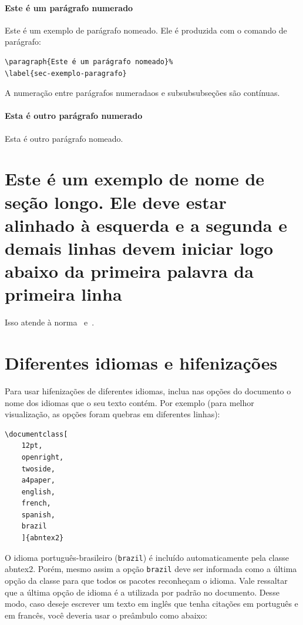 \paragraph{Este é um parágrafo numerado}%
\label{sec-exemplo-paragrafo}

Este é um exemplo de parágrafo nomeado. Ele é produzida com o comando de
parágrafo:

\begin{verbatim}
\paragraph{Este é um parágrafo nomeado}%
\label{sec-exemplo-paragrafo}
\end{verbatim}

A numeração entre parágrafos numeradaos e subsubsubseções são contínuas.

\paragraph{Esta é outro parágrafo numerado}%
\label{sec-exemplo-paragrafo-outro}

Esta é outro parágrafo nomeado.

\section{Este é um exemplo de nome de seção longo. Ele deve estar
alinhado à esquerda e a segunda e demais linhas devem iniciar logo abaixo da
primeira palavra da primeira linha}

Isso atende à norma~
e~.

\section{Diferentes idiomas e hifenizações}%
\label{sec-hifenizacao}

Para usar hifenizações de diferentes idiomas, inclua nas opções do documento o
nome dos idiomas que o seu texto contém. Por exemplo (para melhor
visualização, as opções foram quebras em diferentes linhas):

\begin{verbatim}
\documentclass[
    12pt,
    openright,
    twoside,
    a4paper,
    english,
    french,
    spanish,
    brazil
    ]{abntex2}
\end{verbatim}

O idioma português-brasileiro (\texttt{brazil}) é incluído automaticamente pela
classe \textsf{abntex2}. Porém, mesmo assim a opção \texttt{brazil} deve ser
informada como a última opção da classe para que todos os pacotes reconheçam o
idioma. Vale ressaltar que a última opção de idioma é a utilizada por padrão no
documento. Desse modo, caso deseje escrever um texto em inglês que tenha
citações em português e em francês, você deveria usar o preâmbulo como abaixo:

